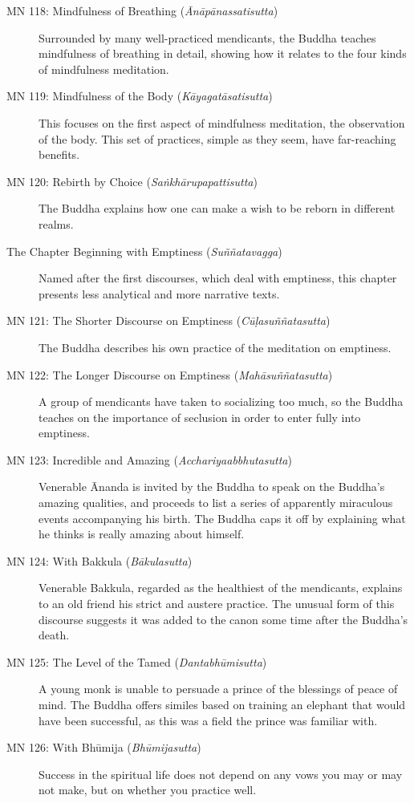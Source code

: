 \documentclass[12pt,openany]{book}%
\begin{document}
\begin{description}
\item[MN 118: Mindfulness of Breathing (\textit{\textsanskrit{Ānāpānassatisutta}})] Surrounded by many well-practiced mendicants, the Buddha teaches mindfulness of breathing in detail, showing how it relates to the four kinds of mindfulness meditation.%
\item[MN 119: Mindfulness of the Body (\textit{\textsanskrit{Kāyagatāsatisutta}})] This focuses on the first aspect of mindfulness meditation, the observation of the body. This set of practices, simple as they seem, have far-reaching benefits.%
\item[MN 120: Rebirth by Choice (\textit{\textsanskrit{Saṅkhārupapattisutta}})] The Buddha explains how one can make a wish to be reborn in different realms.%
\item[The Chapter Beginning with Emptiness (\textit{\textsanskrit{Suññatavagga}})] Named after the first discourses, which deal with emptiness, this chapter presents less analytical and more narrative texts.%
\item[MN 121: The Shorter Discourse on Emptiness (\textit{\textsanskrit{Cūḷasuññatasutta}})] The Buddha describes his own practice of the meditation on emptiness.%
\item[MN 122: The Longer Discourse on Emptiness (\textit{\textsanskrit{Mahāsuññatasutta}})] A group of mendicants have taken to socializing too much, so the Buddha teaches on the importance of seclusion in order to enter fully into emptiness.%
\item[MN 123: Incredible and Amazing (\textit{\textsanskrit{Acchariyaabbhutasutta}})] Venerable Ānanda is invited by the Buddha to speak on the Buddha’s amazing qualities, and proceeds to list a series of apparently miraculous events accompanying his birth. The Buddha caps it off by explaining what he thinks is really amazing about himself.%
\item[MN 124: With Bakkula (\textit{\textsanskrit{Bākulasutta}})] Venerable Bakkula, regarded as the healthiest of the mendicants, explains to an old friend his strict and austere practice. The unusual form of this discourse suggests it was added to the canon some time after the Buddha’s death.%
\item[MN 125: The Level of the Tamed (\textit{\textsanskrit{Dantabhūmisutta}})] A young monk is unable to persuade a prince of the blessings of peace of mind. The Buddha offers similes based on training an elephant that would have been successful, as this was a field the prince was familiar with.%
\item[MN 126: With \textsanskrit{Bhūmija} (\textit{\textsanskrit{Bhūmijasutta}})] Success in the spiritual life does not depend on any vows you may or may not make, but on whether you practice well.%

\end{description}
\end{document}
